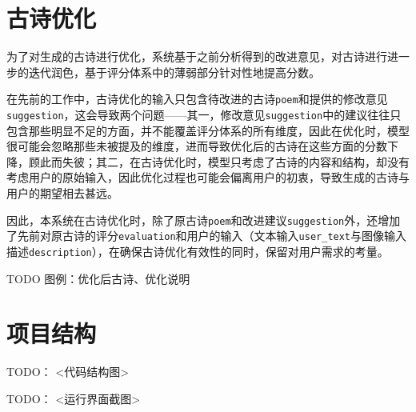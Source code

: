\section{古诗优化}

为了对生成的古诗进行优化，系统基于之前分析得到的改进意见，对古诗进行进一步的迭代润色，基于评分体系中的薄弱部分针对性地提高分数。

在先前的工作中，古诗优化的输入只包含待改进的古诗\verb|poem|和提供的修改意见\verb|suggestion|，这会导致两个问题——其一，修改意见\verb|suggestion|中的建议往往只包含那些明显不足的方面，并不能覆盖评分体系的所有维度，因此在优化时，模型很可能会忽略那些未被提及的维度，进而导致优化后的古诗在这些方面的分数下降，顾此而失彼；其二，在古诗优化时，模型只考虑了古诗的内容和结构，却没有考虑用户的原始输入，因此优化过程也可能会偏离用户的初衷，导致生成的古诗与用户的期望相去甚远。

因此，本系统在古诗优化时，除了原古诗\verb|poem|和改进建议\verb|suggestion|外，还增加了先前对原古诗的评分\verb|evaluation|和用户的输入（文本输入\verb|user_text|与图像输入描述\verb|description|），在确保古诗优化有效性的同时，保留对用户需求的考量。

TODO 图例：优化后古诗、优化说明

\section{项目结构}

TODO： <代码结构图>


TODO： <运行界面截图>